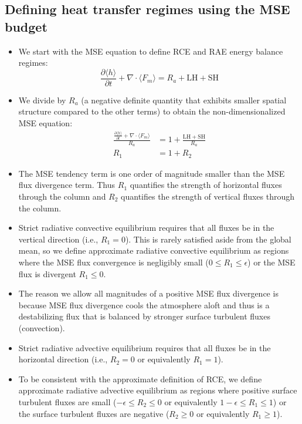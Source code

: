 \documentclass{ametsocV5}
\begin{document}
\subsection{Defining heat transfer regimes using the MSE budget}
\begin{itemize}
  \item We start with the MSE equation to define RCE and RAE energy balance regimes:
        \begin{equation} \label{eq:mse}
          \frac{\partial \langle h \rangle}{\partial t} + \nabla\cdot \langle F_{m} \rangle = R_{a} + \mathrm{LH+SH}
        \end{equation}
  \item We divide by \(R_{a}\) (a negative definite quantity that exhibits smaller spatial structure compared to the other terms) to obtain the non-dimensionalized MSE equation:
        \begin{align}
          \frac{\frac{\partial \langle h \rangle}{\partial t} + \nabla\cdot \langle F_{m} \rangle }{R_{a}} &= 1 + \frac{\mathrm{LH+SH}}{R_{a}} \\
          R_{1} &= 1 + R_{2}
        \end{align}
  \item The MSE tendency term is one order of magnitude smaller than the MSE flux divergence term. Thus \(R_{1}\) quantifies the strength of horizontal fluxes through the column and \(R_{2}\) quantifies the strength of vertical fluxes through the column.
  \item Strict radiative convective equilibrium requires that all fluxes be in the vertical direction (i.e., \(R_{1}=0\)). This is rarely satisfied aside from the global mean, so we define approximate radiative convective equilibrium as regions where the MSE flux convergence is negligibly small (\(0 \le R_{1} \le \epsilon\)) or the MSE flux is divergent \(R_{1}\le 0\).
  \item The reason we allow all magnitudes of a positive MSE flux divergence is because MSE flux divergence cools the atmosphere aloft and thus is a destabilizing flux that is balanced by stronger surface turbulent fluxes (convection).
  \item Strict radiative advective equilibrium requires that all fluxes be in the horizontal direction (i.e., \(R_{2}=0\) or equivalently \(R_{1}=1\)).
  \item To be consistent with the approximate definition of RCE, we define approximate radiative advective equilibrium as regions where positive surface turbulent fluxes are small (\(-\epsilon \le R_{2} \le 0 \) or equivalently \(1-\epsilon \le R_{1} \le 1\)) or the surface turbulent fluxes are negative (\(R_{2} \ge 0 \) or equivalently \(R_{1} \ge 1\)).

\end{itemize}
\end{document}
